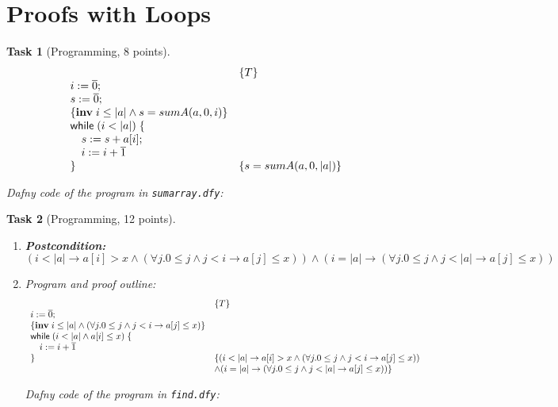 \documentclass{article}
\newcommand{\stmt}[1]{\text{\sffamily #1}}
\newcommand{\whiles}[1]{\stmt{while}\;(#1)\;\{}
\newcommand{\assigns}[2]{#1 := #2}
\newcommand{\consts}[1]{\overline{#1}}
\newcommand{\inv}[1]{\{\textbf{inv}\;\ensuremath{#1}\}}
\theoremstyle{task}
\newtheorem{task}{Task}[section]
\begin{document}
\section{Proofs with Loops}

\begin{task}[Programming, 8 points]\
    \[
        \begin{array}{l l}
            & \{T\} \\
            \assigns{i}{\consts{0}}; & \\
            \assigns{s}{\consts{0}}; & \\
            \inv{i \leq |a| \wedge s = sumA(a, 0, i)} & \\
            \whiles{i < |a|} & \\
            \quad \assigns{s}{s + a[i]}; & \\
            \quad \assigns{i}{i + \consts{1}} & \\
            \} & \{s = sumA(a, 0, |a|)\}
        \end{array}
    \]

    \vspace{1em}
    Dafny code of the program in \texttt{sumarray.dfy}:
    
\end{task}

\begin{task}[Programming, 12 points]\
    \begin{enumerate}
        \item \textbf{Postcondition:} $(i < |a| \rightarrow a[i] > x \wedge (\forall
            j. 0 \leq j \wedge j < i \rightarrow a[j] \leq x)) \wedge
            (i = |a| \rightarrow (\forall j. 0 \leq j \wedge j < |a| \rightarrow a[j]
            \leq x))$
        \item Program and proof outline:
            \[
                \begin{array}{l l}
                    & \{T\} \\
                    \assigns{i}{\consts{0}}; & \\
                    \inv{i \leq |a| \wedge (\forall j. 0 \leq j \wedge j < i \rightarrow a[j] \leq x)} & \\
                    \whiles{i < |a| \wedge a[i] \leq x} & \\
                    \quad \assigns{i}{i + \consts{1}} & \\
                    \} & \{(i < |a| \rightarrow a[i] > x \wedge (\forall j. 0 \leq j \wedge j < i \rightarrow a[j] \leq x)) \\
                       & \wedge (i = |a| \rightarrow (\forall j. 0 \leq j \wedge j < |a| \rightarrow a[j] \leq x))\}
                \end{array}
            \]

            \vspace{1em}
            Dafny code of the program in \texttt{find.dfy}:
            
    \end{enumerate}
\end{task}
\end{document}
